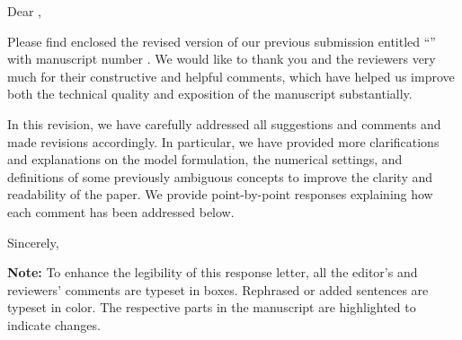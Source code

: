 \thispagestyle{empty}
\noindent Dear \editorname,

Please find enclosed the revised version of our previous submission entitled ``\thetitle'' with manuscript number \manuscript. We would like to thank you and the reviewers very much for their constructive and helpful comments, which have helped us improve both the technical quality and exposition of the manuscript substantially. 

In this revision, we have carefully addressed all suggestions and comments and made revisions accordingly. In particular, we have provided more clarifications and explanations on the model formulation, the numerical settings, and definitions of some previously ambiguous concepts to improve the clarity and readability of the paper. We provide point-by-point responses explaining how each comment has been addressed below.

\vspace{5em}

\noindent Sincerely,

\noindent\theauthor

\vfill
\textbf{Note:} To enhance the legibility of this response letter, all the editor's and reviewers' comments are typeset in boxes. Rephrased or added sentences are typeset in color. The respective parts in the manuscript are highlighted to indicate changes.